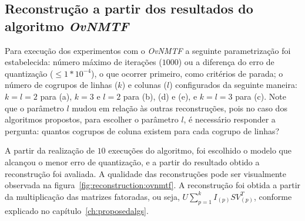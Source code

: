 \documentclass[
    12pt,                %
    oneside,            %
    a4paper,            %
    english,            %
    brazil                %
    ]{abntex2ppgsi}
\begin{document}
\subsection{Reconstrução a partir dos resultados do algoritmo \textit{OvNMTF}}
\label{subsec:results-reconstruction-ovnmtf}

Para execução dos experimentos com o \textit{OvNMTF} a seguinte parametrização foi estabelecida: número máximo de iterações ($1000$) ou a diferença do erro de quantização ($\leq 1*10^{-4}$), o que ocorrer primeiro, como critérios de parada; o número de cogrupos de linhas ($k$) e colunas ($l$) configurados da seguinte maneira: $k = l = 2$ para (a), $k = 3$ e $l = 2 $ para (b), (d) e (e), e $k = l = 3$ para (c).
Note que o parâmetro $l$ mudou em relação às outras reconstruções, pois no caso dos algoritmos propostos, para escolher o parâmetro $l$, é necessário responder a pergunta: quantos cogrupos de coluna existem para cada cogrupo de linhas?

A partir da realização de $10$ execuções do algoritmo, foi escolhido o modelo que alcançou o menor erro de quantização, e a partir do resultado obtido a reconstrução foi avaliada.
A qualidade das reconstruções pode ser visualmente observada na figura~\ref{fig:reconstruction:ovnmtf}.
A reconstrução foi obtida a partir da multiplicação das matrizes fatoradas, ou seja, $U \sum_{p=1}^{k} I_{(p)} S V_{(p)}^T$, conforme explicado no capítulo~\ref{ch:proposedalgs}.
\end{document}
